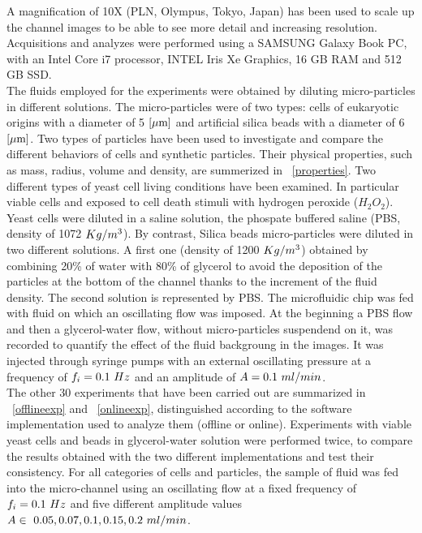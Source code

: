 \documentclass[journal]{IEEEtran}
\theoremstyle{definition}
\theoremstyle{remark}
\begin{document}
A magnification of 10X (PLN, Olympus, Tokyo, Japan) has been used to scale up the channel images to be able to see more detail and increasing resolution.
Acquisitions and analyzes were performed using a SAMSUNG Galaxy Book PC, with an Intel Core i7 processor, INTEL Iris Xe Graphics, 16 GB RAM and 512 GB SSD.
\\The fluids employed for the experiments were obtained by diluting micro-particles in different solutions. The micro-particles were of two types: cells of eukaryotic origins with a diameter of 5 $[\rm\mu m]$ and artificial silica beads with a diameter of 6 $[\rm\mu m]$. Two types of particles have been used to investigate and compare the different behaviors of cells and synthetic particles. Their physical properties, such as mass, radius, volume and density, are summerized in ~\tab\ref{properties}. Two different types of yeast cell living conditions have been examined. In particular viable cells and exposed to cell death stimuli with hydrogen peroxide ($H_2O_2$).
Yeast cells were diluted in a saline solution, the phospate buffered saline (PBS, density of 1072 $Kg/m^3$). By contrast, Silica beads micro-particles were diluted in two different solutions. A first one (density of 1200 $Kg/m^3$) obtained by combining 20\% of water with 80\% of glycerol to avoid the deposition of the particles at the bottom of the channel thanks to the increment of the fluid density. The second solution is represented by PBS.
The microfluidic chip was fed with fluid on which an oscillating flow was imposed.
At the beginning a PBS flow and then a glycerol-water flow, without micro-particles suspendend on it, was recorded to quantify the effect of the fluid backgroung in the images. It was injected through syringe pumps with an external oscillating pressure at a frequency of $f_i=0.1~Hz$ and an amplitude of $A=0.1~ml/min$.
\\The other 30 experiments that have been carried out are summarized in ~\tab\ref{offlineexp} and ~\tab\ref{onlineexp}, distinguished according to the software implementation used to analyze them (offline or online). Experiments with viable yeast cells and beads in glycerol-water solution were performed twice, to compare the results obtained with the two different implementations and test their consistency.
For all categories of cells and particles, the sample of fluid was fed into the micro-channel using an oscillating flow at a fixed frequency of $f_i=0.1~Hz$ and five different amplitude values $A\in~{0.05, 0.07, 0.1, 0.15, 0.2~ml/min}$.
\end{document}
